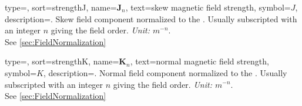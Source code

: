 {
    type=\symboltype,
    sort={strengthJ},
    name={$\bm J_n$},
    text={skew magnetic field strength},
    symbol={\ensuremath{J}},
    description={.
    Skew field component normalized to the .
    Usually subscripted with an integer $n$ giving the field order.
    \textit{Unit: $m^{-n}$}.\\
    See \cref{sec:FieldNormalization}%
    }
}

{
    type=\symboltype,
    sort={strengthK},
    name={$\bm K_n$},
    text={normal magnetic field strength},
    symbol={\ensuremath{K}},
    description={.
    Normal field component normalized to the .
    Usually subscripted with an integer $n$ giving the field order.
    \textit{Unit: $m^{-n}$}.\\
    See \cref{sec:FieldNormalization}%
    }
}
